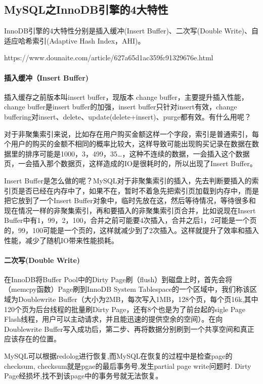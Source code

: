 \documentclass[../../../interview-questions.tex]{subfiles}
\begin{document}
\subsection{MySQL之InnoDB引擎的4大特性}

InnoDB引擎的4大特性分别是插入缓冲(Insert Buffer)、二次写(Double Write)、自适应哈希索引(Adaptive Hash Index，AHI)。

https://www.dounaite.com/article/627a65d1ac359fc91329676e.html

\paragraph{插入缓冲（Insert Buffer)}

插入缓存之前版本叫insert buffer，现版本 change buffer，主要提升插入性能，change buffer是insert buffer的加强，insert buffer只针对insert有效，change buffering对insert、delete、update(delete+insert)、purge都有效。有什么用呢？

对于非聚集索引来说，比如存在用户购买金额这样一个字段，索引是普通索引，每个用户的购买的金额不相同的概率比较大，这样导致可能出现购买记录在数据在数据里的排序可能是1000，3，499，35…，这种不连续的数据，一会插入这个数据页，一会插入那个数据页，这样造成的IO是很耗时的，所以出现了Insert Buffer。

Insert Buffer是怎么做的呢？MySQL对于非聚集索引的插入，先去判断要插入的索引页是否已经在内存中了，如果不在，暂时不着急先把索引页加载到内存中，而是把它放到了一个Insert Buffer对象中，临时先放在这，然后等待情况，等待很多和现在情况一样的非聚集索引，再和要插入的非聚集索引页合并，比如说现在Insert Buffer中有1，99，2，100，合并之前可能要4次插入，合并之后1，2可能是一个页的，99，100可能是一个页的，这样就减少到了2次插入。这样就提升了效率和插入性能，减少了随机IO带来性能损耗。

\paragraph{二次写(Double Write)}

在InnoDB将Buffer Pool中的Dirty Page刷（flush）到磁盘上时，首先会将（memcpy函数）Page刷到InnoDB System Tablespace的一个区域中，我们称该区域为Doublewrite Buffer（大小为2MB，每次写入1MB，128个页，每个页16k,其中120个页为后台线程的批量刷Dirty Page，还有8个也是为了前台起的sigle Page Flash线程，用户可以主动请求，并且能迅速的提供空余的空间）。在向Doublewrite Buffer写入成功后，第二步、再将数据分别刷到一个共享空间和真正应该存在的位置。

MySQL可以根据redolog进行恢复,而MySQL在恢复的过程中是检查page的checksum, checksum就是pgae的最后事务号,发生partial page write问题时. Dirty Page经损坏,找不到该page中的事务号就无法恢复。
\end{document}
